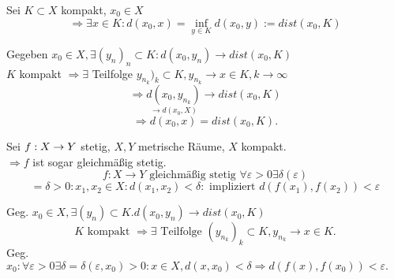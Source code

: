 \documentclass[../ana2.tex]{subfiles}
\begin{document}
\begin{bem}
    Sei \(K \subset X\) kompakt, \(x_0 \in X\)
    \[ \Rightarrow \exists x \in K: d(x_0, x) 
    = \underset{y \in K}{\inf} d(x_0, y) 
    := dist(x_0, K) \]
\end{bem}
\begin{bew}
    Gegeben \( x_0 \in X, \exists (y_n)_n \subset K: 
    d(x_0, y_n) \rightarrow dist(x_0, K) \) \\
    \(K\) kompakt \( \Rightarrow \exists \) Teilfolge 
    \(y_{n_k})_k \subset K, y_{n_k} \rightarrow x \in K, 
    k \rightarrow \infty\)    
    \[ \Rightarrow \underset{\rightarrow d(x_0, X)}{d(x_0, y_{n_k})} 
    \rightarrow dist(x_0, K) \]
    \[ \Rightarrow d(x_0, x) = dist(x_0, K). \]
\end{bew}
\begin{satz}
    Sei \( f:X\rightarrow Y \) stetig, 
    \( X, Y \) metrische Räume, \(X\)
    kompakt. \\
    \( \Rightarrow f \) ist sogar gleichmäßig 
    stetig.
    \[ f: X \rightarrow Y \text{ gleichmäßig stetig }
    \forall \varepsilon > 0 \exists 
    \delta(\varepsilon) \]
    \[ = \delta > 0:
    x_1, x_2 \in X: d(x_1, x_2) < \delta:
    \text{ impliziert } d(f(x_1), f(x_2)) < \varepsilon \]
\end{satz}
\begin{bew}
    Geg. \( x_0 \in X, \exists (y_n) \subset K. d(x_0, y_n) 
    \rightarrow dist(x_0, K) \)
    \[ K \text{ kompakt } \Rightarrow \exists \text{ Teilfolge } 
    (y_{n_k})_k \subset K, y_{n_k} \rightarrow x \in K. \]
    Geg. \( x_0: \forall \varepsilon > 0 \exists \delta 
    = \delta(\varepsilon, x_0) > 0:
    x \in X, d(x, x_0) < \delta \Rightarrow d(f(x), f(x_0)) 
    < \varepsilon. \)
\end{bew}
\end{document}
